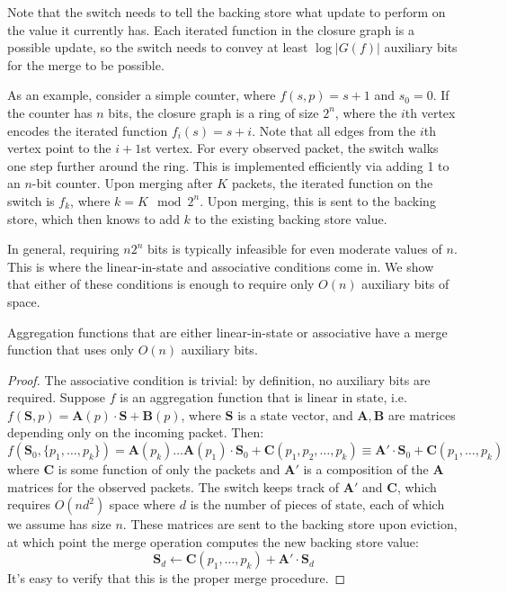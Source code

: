 Note that the switch needs to tell the backing store what update to perform on the value it currently has. Each iterated function in the closure graph is a possible update, so the switch needs to convey at least $\log |G(f)|$ auxiliary bits for the merge to be possible.

As an example, consider a simple counter, where $f(s, p) = s + 1$ and $s_0 = 0$. If the counter has $n$ bits, the closure graph is a ring of size $2^n$, where the $i$th vertex encodes the iterated function $f_i(s) = s + i$. Note that all edges from the $i$th vertex point to the $i+1$st vertex. For every observed packet, the switch walks one step further around the ring. This is implemented efficiently via adding 1 to an $n$-bit counter. Upon merging after $K$ packets, the iterated function on the switch is $f_{k}$, where $k = K \mod 2^n$. Upon merging, this is sent to the backing store, which then knows to add $k$ to the existing backing store value.

In general, requiring $n2^n$ bits is typically infeasible for even moderate values of $n$. This is where the linear-in-state and associative conditions come in. We show that either of these conditions is enough to require only $O(n)$ auxiliary bits of space.

\begin{theorem}[Theorem 4.3.2]
 Aggregation functions that are either linear-in-state or associative have a merge function that uses only $O(n)$ auxiliary bits.
\end{theorem}
\begin{proof}
The associative condition is trivial: by definition, no auxiliary bits are required. 
Suppose $f$ is an aggregation function that is linear in state, i.e. $f(\mathbf{S}, p) = \mathbf{A}(p) \cdot \mathbf{S} + \mathbf{B}(p)$, where $\mathbf{S}$ is a state vector, and $\mathbf{A,B}$ are matrices depending only on the incoming packet. Then:
\[ f(\mathbf{S}_0, \{p_1, \ldots, p_k\}) = \mathbf{A}(p_k)\ldots \mathbf{A}(p_1) \cdot \mathbf{S}_0 + \mathbf{C}(p_1, p_2, \ldots, p_k) \equiv \mathbf{A'} \cdot \mathbf{S}_0 + \mathbf{C}(p_1, \ldots, p_k)\]
where $\mathbf{C}$ is some function of only the packets and $\mathbf{A'}$ is a composition of the $\mathbf{A}$ matrices for the observed packets. The switch keeps track of $\mathbf{A'}$ and $\mathbf{C}$, which requires $O(nd^2)$ space where $d$ is the number of pieces of state, each of which we assume has size $n$. These matrices are sent to the backing store upon eviction, at which point the merge operation computes the new backing store value:
\[ \mathbf{S}_d \leftarrow \mathbf{C}(p_1, \ldots, p_k) + \mathbf{A'} \cdot \mathbf{S}_d \]
It's easy to verify that this is the proper merge procedure.
\end{proof}

